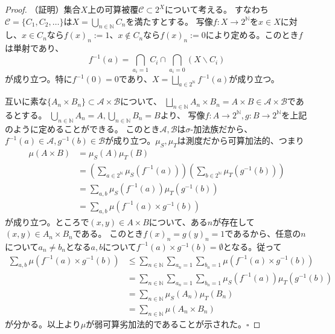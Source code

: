 \documentclass[../root.tex]{subfiles}
\begin{document}
\begin{proof}
（証明）集合$ X $上の可算被覆$ \mathscr{C}\subset 2^{X} $について考える。
すなわち$ \mathscr{C}=\lbrace C_{1}, C_{2}, \dotsc \rbrace $は$ X=\bigcup_{n\in\mathbb{N}}C_{n} $を満たすとする。
写像$ f\colon X\rightarrow 2^{\mathbb{N}} $を$ x\in X $に対し、$ x\in C_{n} $なら$ f( x )_{n}:=1 $、$ x\notin C_{n} $なら$ f( x )_{n}:=0 $により定める。このとき$ f $は単射であり、
\[ f^{-1}( a )=\bigcap_{a_{i}=1}C_{i}\cap\bigcap_{a_{i}=0}( X\backslash C_{i} ) \]
が成り立つ。特に$ f^{-1}( 0 )=0 $であり、$ X=\bigsqcup_{a\in2^{\mathbb{N}}}f^{-1}( a ) $が成り立つ。

互いに素な$ \lbrace A_{n}\times B_{n} \rbrace\subset\mathscr{A}\times\mathscr{B} $について、
$ \bigsqcup_{n\in\mathbb{N}}A_{n}\times B_{n}=A\times B\in\mathscr{A}\times\mathscr{B} $であるとする。
$ \bigcup_{n\in\mathbb{N}}A_{n}=A, \bigcup_{n\in\mathbb{N}}B_{n}=B $より、
写像$ f\colon A\rightarrow 2^{\mathbb{N}}, g\colon B\rightarrow 2^{\mathbb{N}} $を上記のように定めることができる。
このとき$ \mathscr{A}, \mathscr{B} $は$ \sigma $-加法族だから、$ f^{-1}( a )\in\mathscr{A}, g^{-1}( b )\in\mathscr{B} $が成り立つ。$ \mu_{S}, \mu_{T} $は測度だから可算加法的、つまり
\begin{align*}
\mu( A\times B ) &= \mu_{S}( A )\mu_{T}( B ) \\
&= \left( \sum_{a\in 2^{\mathbb{N}}}\mu_{S}( f^{-1}( a ) ) \right)\left( \sum_{b\in 2^{\mathbb{N}}}\mu_{T}( g^{-1}( b ) ) \right) \\
&=\sum_{a, b}\mu_{S}( f^{-1}( a ) )\mu_{T}( g^{-1}( b ) ) \\
&= \sum_{a, b}\mu( f^{-1}( a )\times g^{-1}( b ) )
\end{align*}
が成り立つ。ところで$ ( x, y )\in A\times B $について、ある$ n $が存在して$ ( x, y )\in A_{n}\times B_{n} $である。
このとき$ f( x )_{n}=g( y )_{n}=1 $であるから、任意の$ n $について$ a_{n}\neq b_{n} $となる$ a, b $について$ f^{-1}( a )\times g^{-1}( b )=\emptyset $となる。従って
\begin{align*} \sum_{a, b}\mu( f^{-1}( a )\times g^{-1}( b ) ) &\le \sum_{n\in\mathbb{N}}\sum_{a_{n}=1}\sum_{b_{n}=1}\mu( f^{-1}( a )\times g^{-1}( b ) ) \\
&=\sum_{n\in\mathbb{N}}\sum_{a_{n}=1}\sum_{b_{n}=1}\mu_{S}( f^{-1}( a ) )\mu_{T}( g^{-1}( b ) ) \\ &=\sum_{n\in\mathbb{N}}\mu_{S}( A_{n} )\mu_{T}( B_{n} ) \\
&= \sum_{n\in\mathbb{N}}\mu( A_{n}\times B_{n} )
\end{align*}
が分かる。以上より$ \mu $が弱可算劣加法的であることが示された。$ \square $
\end{proof}
\end{document}
